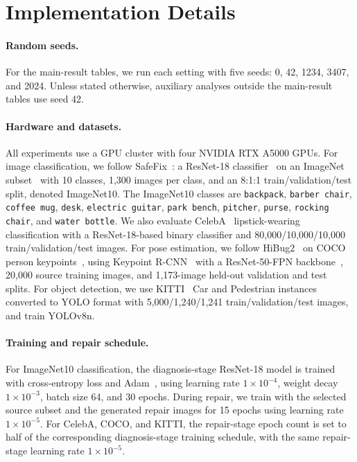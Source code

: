 \documentclass{article}
\newcommand{\safefix}{SafeFix\xspace}
\begin{document}
\section{Implementation Details}
\label{app:implementation-details}

\paragraph{Random seeds.}
For the main-result tables, we run each setting with five seeds: 0, 42, 1234, 3407, and 2024. Unless stated otherwise, auxiliary analyses outside the main-result tables use seed 42.

\paragraph{Hardware and datasets.}
All experiments use a GPU cluster with four NVIDIA RTX A5000 GPUs. For image classification, we follow \safefix~\citep{xu2025safefix}: a ResNet-18 classifier~\citep{he2016deep} on an ImageNet subset~\citep{deng2009imagenet} with 10 classes, 1,300 images per class, and an 8:1:1 train/validation/test split, denoted ImageNet10. The ImageNet10 classes are \texttt{backpack}, \texttt{barber chair}, \texttt{coffee mug}, \texttt{desk}, \texttt{electric guitar}, \texttt{park bench}, \texttt{pitcher}, \texttt{purse}, \texttt{rocking chair}, and \texttt{water bottle}. We also evaluate CelebA~\citep{liu2015deep} lipstick-wearing classification with a ResNet-18-based binary classifier and 80,000/10,000/10,000 train/validation/test images. For pose estimation, we follow HiBug2~\citep{chen2025hibug2} on COCO person keypoints~\citep{lin2014microsoft}, using Keypoint R-CNN~\citep{mask-rcnn-2017} with a ResNet-50-FPN backbone~\citep{he2016deep}, 20,000 source training images, and 1,173-image held-out validation and test splits. For object detection, we use KITTI~\citep{geiger2012we} Car and Pedestrian instances converted to YOLO format with 5,000/1,240/1,241 train/validation/test images, and train YOLOv8n.

\paragraph{Training and repair schedule.}
For ImageNet10 classification, the diagnosis-stage ResNet-18 model is trained with cross-entropy loss and Adam~\citep{kingma2015adam}, using learning rate $1\times10^{-4}$, weight decay $1\times10^{-3}$, batch size 64, and 30 epochs. During repair, we train with the selected source subset and the generated repair images for 15 epochs using learning rate $1\times10^{-5}$. For CelebA, COCO, and KITTI, the repair-stage epoch count is set to half of the corresponding diagnosis-stage training schedule, with the same repair-stage learning rate $1\times10^{-5}$.
\end{document}
